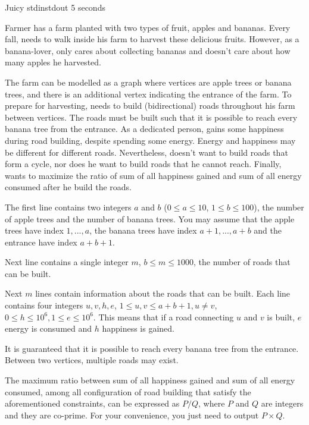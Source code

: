 \begin{problem}{Juicy}
{stdin}{stdout}
{5 seconds}{}{}

Farmer \pittoresque has a farm planted with two types of fruit, apples and bananas. Every fall, \pittoresque needs to walk inside his farm to harvest these delicious fruits. However, as a banana-lover, \pittoresque only cares about collecting bananas and doesn't care about how many apples he harvested.

The farm can be modelled as a graph where vertices are apple trees or banana trees, and there is an additional vertex indicating the entrance of the farm. To prepare for harvesting, \pittoresque needs to build (bidirectional) roads throughout his farm between vertices. The roads must be built such that it is possible to reach every banana tree from the entrance. As a dedicated person, \pittoresque gains some happiness during road building, despite spending some energy. Energy and happiness may be different for different roads. Nevertheless, \pittoresque doesn't want to build roads that form a cycle, nor does he want to build roads that he cannot reach. Finally, \pittoresque wants to maximize the ratio of sum of all happiness gained and sum of all energy consumed after he build the roads.

\InputFile

The first line contains two integers $a$ and $b$ ($0 \le a \le 10$, $1 \le b \le 100$), the number of apple trees and the number of banana trees. You may assume that the apple trees have index $1, ..., a$, the banana trees have index $a + 1, ..., a + b$ and the entrance have index $a + b + 1$.

Next line contains a single integer $m$, $b \leq m \leq 1000$, the number of roads that can be built.

Next $m$ lines contain information about the roads that can be built. Each line contains four integers $u, v, h, e$, $1 \le u, v \le a + b + 1, u \neq v$, $0 \le h \le 10^6, 1 \le e \le 10^6$. This means that if a road connecting $u$ and $v$ is built, $e$ energy is consumed and $h$ happiness is gained.

It is guaranteed that it is possible to reach every banana tree from the entrance. Between two vertices, multiple roads may exist.

\OutputFile

The maximum ratio between sum of all happiness gained and sum of all energy consumed, among all configuration of road building that satisfy the aforementioned constraints, can be expressed as $P/Q$, where $P$ and $Q$ are integers and they are co-prime. For your convenience, you just need to output $P\times Q$.

\newpage

\Examples

\begin{example}
%
\end{example}

\begin{example}
%
\end{example}



\end{problem}
